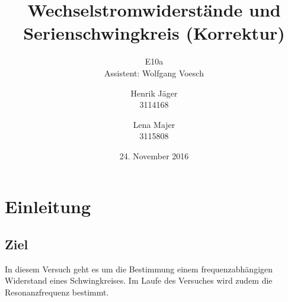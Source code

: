 \documentclass[12pt,a4paper,]{scrreprt}
\begin{document}
\title{Wechselstromwiderstände und Serienschwingkreis (Korrektur)}
\author{Henrik Jäger \\ 3114168 \and Lena Majer \\ 3115808}
\subtitle{E10a \\  Assistent: Wolfgang Voesch}
\subject{Physikalisches Praktikum I}
\publishers{Universität Stuttgart}
\date{24. November 2016}

\maketitle%

\tableofcontents   %
\pagebreak
\chapter{Einleitung}
\section{Ziel}
In diesem Versuch geht es um die Bestimmung einem frequenzabhängigen Widerstand eines Schwingkreises. Im Laufe des Versuches wird zudem die Resonanzfrequenz bestimmt.
\end{document}
